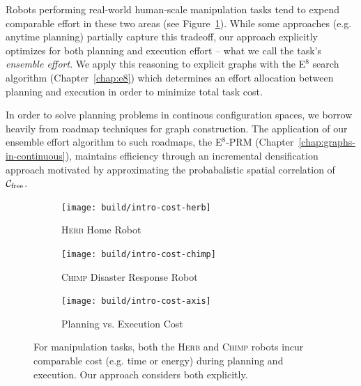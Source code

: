 Robots performing real-world human-scale manipulation tasks
tend to expend comparable effort in these two areas
(see Figure~\ref{fig:plan-exec-cost}).
While some approaches (e.g. anytime planning) partially capture
this tradeoff,
our approach explicitly optimizes for both planning
and execution effort
-- what we call the task's \emph{ensemble effort}.
We apply this reasoning to explicit graphs
with the E$^8$ search algorithm (Chapter~\ref{chap:e8})
which determines an effort allocation between planning and execution
in order to minimize total task cost.

In order to solve planning problems in continous configuration spaces,
we borrow heavily from roadmap techniques for graph construction.
The application of our ensemble effort algorithm to such roadmaps,
the E$^8$-PRM (Chapter~\ref{chap:graphs-in-continuous}),
maintains efficiency through an
incremental densification approach
motivated by approximating the probabalistic spatial correlation of
$\mathcal{C}_{\mbox{\scriptsize free}}$.

{
\setlength{\offsetpage}{0.5in}
\begin{figure}[t]
\begin{widepage}
\begin{center}
   \begin{subfigure}[b]{1.4in}
      \begin{center}
      \texttt{[image: build/intro-cost-herb]}
      \end{center}
      \caption{\textsc{Herb} Home Robot}
   \end{subfigure}%
   \quad%
   \begin{subfigure}[b]{2.0in}
      \begin{center}
      \texttt{[image: build/intro-cost-chimp]}
      \end{center}
      \caption{\textsc{Chimp} Disaster Response Robot}
   \end{subfigure}%
   \quad%
   \begin{subfigure}[b]{2.0in}
      \begin{center}
      \texttt{[image: build/intro-cost-axis]}
      \end{center}
      \caption{Planning vs. Execution Cost}
   \end{subfigure}
   \caption{For manipulation tasks,
      both the \textsc{Herb} \cite{srinivasa2012herb20}
      and \textsc{Chimp} \cite{stentz2014chimp} robots
      incur comparable cost (e.g. time or energy)
      during planning and execution.
      Our approach considers both explicitly.}
   \label{fig:plan-exec-cost}
\end{center}
\end{widepage}
\end{figure}
}

